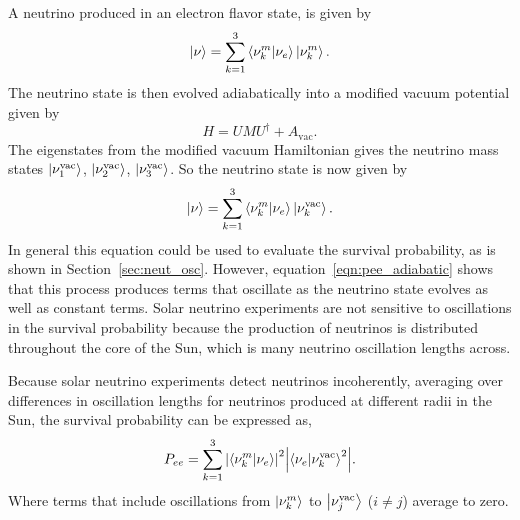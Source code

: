 A neutrino produced in an electron flavor state, is given by
\begin{equation}
    \ket{\nu} = \sum_{k=1}^{3}\braket{\nu^{m}_{k}}{\nu_{e}}\ket{\nu^{m}_{k}}\text{.}
\end{equation}
The neutrino state is then evolved adiabatically into a modified
vacuum potential given by
\begin{equation}
    H = U M U^{\dagger} + A_{\mathrm{vac}}\text{.}
\end{equation}
The eigenstates from the modified vacuum Hamiltonian gives the neutrino mass
states $\ket{\nu^{\mathrm{vac}}_{1}}$, $\ket{\nu^{\mathrm{vac}}_{2}}$, $\ket{\nu^{\mathrm{vac}}_{3}}$.
So the neutrino state is now given by
\begin{equation}
    \ket{\nu} = \sum_{k=1}^{3}\braket{\nu^{m}_{k}}{\nu_{e}}\ket{\nu^{\mathrm{vac}}_{k}}\text{.}
\end{equation}
In general this equation could be used to evaluate the
survival probability, as is shown in Section~\ref{sec:neut_osc}.
However, equation~\ref{eqn:pee_adiabatic} shows that this process produces
terms that oscillate as the neutrino state evolves as well as constant
terms.
Solar neutrino experiments are not sensitive to oscillations in the survival
probability because the production of neutrinos is distributed
throughout the core of the Sun, which is many neutrino oscillation lengths
across.


Because solar neutrino experiments detect neutrinos incoherently, averaging
over differences in oscillation lengths for neutrinos produced
at different radii in the Sun, the survival probability can be expressed as,
\begin{equation}
    P_{ee} = \sum_{k=1}^{3}\abs{\braket{\nu^{m}_{k}}{\nu_{e}}}^{2}\abs{\braket{\nu_{e}}{\nu^{\mathrm{vac}}_{k}}^{2}}\text{.}
\end{equation}
Where terms that include oscillations from $\ket{\nu^{m}_{k}}$ to $\ket{\nu^\mathrm{vac}_{j}}$ ($i \ne j$)
average to zero.

